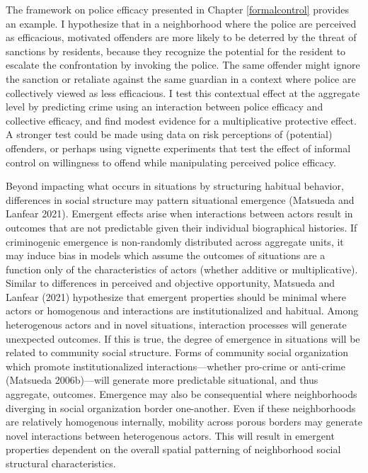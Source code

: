 \documentclass [11pt, proquest] {uwthesis}[2015/03/03]
\begin{document}
The framework on police efficacy presented in Chapter \ref{formalcontrol} provides an example. I hypothesize that in a neighborhood where the police are perceived as efficacious, motivated offenders are more likely to be deterred by the threat of sanctions by residents, because they recognize the potential for the resident to escalate the confrontation by invoking the police. The same offender might ignore the sanction or retaliate against the same guardian in a context where police are collectively viewed as less efficacious. I test this contextual effect at the aggregate level by predicting crime using an interaction between police efficacy and collective efficacy, and find modest evidence for a multiplicative protective effect. A stronger test could be made using data on risk perceptions of (potential) offenders, or perhaps using vignette experiments that test the effect of informal control on willingness to offend while manipulating perceived police efficacy.

Beyond impacting what occurs in situations by structuring habitual behavior, differences in social structure may pattern situational emergence (Matsueda and Lanfear 2021). Emergent effects arise when interactions between actors result in outcomes that are not predictable given their individual biographical histories. If criminogenic emergence is non-randomly distributed across aggregate units, it may induce bias in models which assume the outcomes of situations are a function only of the characteristics of actors (whether additive or multiplicative). Similar to differences in perceived and objective opportunity, Matsueda and Lanfear (2021) hypothesize that emergent properties should be minimal where actors or homogenous and interactions are institutionalized and habitual. Among heterogenous actors and in novel situations, interaction processes will generate unexpected outcomes. If this is true, the degree of emergence in situations will be related to community social structure. Forms of community social organization which promote institutionalized interactions---whether pro-crime or anti-crime (Matsueda 2006b)---will generate more predictable situational, and thus aggregate, outcomes. Emergence may also be consequential where neighborhoods diverging in social organization border one-another. Even if these neighborhoods are relatively homogenous internally, mobility across porous borders may generate novel interactions between heterogenous actors. This will result in emergent properties dependent on the overall spatial patterning of neighborhood social structural characteristics.
\end{document}

